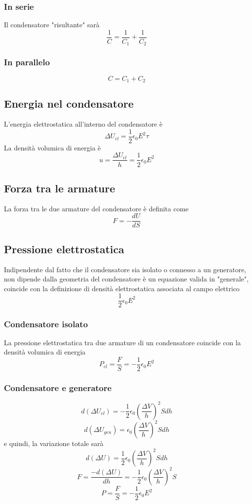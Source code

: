 \documentclass[a4paper]{report}
\begin{document}
  \subsubsection{In serie}
  Il condensatore "risultante" sarà
  \[ \frac{1}{C} = \frac{1}{C_1} + \frac{1}{C_2} \]

  \subsubsection{In parallelo}
  \[ C = C_1 + C_2 \]

  \subsection{Energia nel condensatore}
  L'energia elettrostatica all'interno del condensatore è
  \[ \Delta U_{el} = \frac{1}{2} \epsilon_0 E^2 \tau \]
  La densità volumica di energia è
  \[ u = \frac{\Delta U_{el}}{h} = \frac{1}{2} \epsilon_0 E^2 \]

  \subsection{Forza tra le armature}
  La forza tra le due armature del condensatore è definita come
  \[ F = -\frac{dU}{dS} \]

  \subsection{Pressione elettrostatica}
  Indipendente dal fatto che il condensatore sia isolato o connesso a un generatore, non dipende dalla geometria del condensatore è un equazione valida in "generale", coincide con la definizione di densità elettrostatica associata al campo elettrico
  \[ \frac{1}{2} \epsilon_0 E^2 \]

  \subsubsection{Condensatore isolato}
  La pressione elettrostatica tra due armature di un condensatore coincide con la densità volumica di energia
  \[ P_{el} = \frac{F}{S} = -\frac{1}{2} \epsilon_0 E^2 \]

  \subsubsection{Condensatore e generatore}
  \[ d(\Delta U_{el}) = -\frac{1}{2} \epsilon_0 (\frac{\Delta V}{h})^2 S dh \]
  \[ d(\Delta U_{gen}) = \epsilon_0 (\frac{\Delta V}{h})^2 S dh \]
  e quindi, la variazione totale sarà
  \[ d(\Delta U) =\frac{1}{2} \epsilon_0 (\frac{\Delta V}{h})^2 S dh \]
  \[ F = \frac{-d(\Delta U)}{dh} = -\frac{1}{2} \epsilon_0 (\frac{\Delta V}{h})^2 S \]
  \[ P = \frac{F}{S} = -\frac{1}{2} \epsilon_0 E^2 \]
\end{document}

